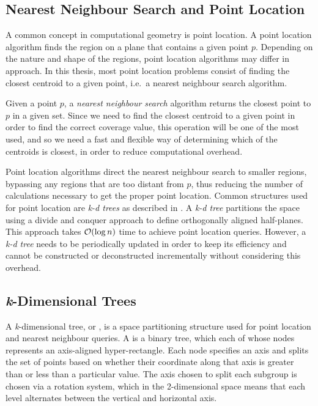 \subsection{Nearest Neighbour Search and Point Location}
A common concept in computational geometry is point location. A point location algorithm finds the region on a plane that contains a given point $p$. Depending on the nature and shape of the regions, point location algorithms may differ in approach. In this thesis, most point location problems consist of finding the closest centroid to a given point, i.e.\ a nearest neighbour search algorithm.

Given a point $p$, a \emph{nearest neighbour search} algorithm returns the closest point to $p$ in a given set. Since we need to find the closest centroid to a given point in order to find the correct coverage value, this operation will be one of the most used, and  so we need a fast and flexible way of determining which of the centroids is closest, in order to reduce computational overhead. 

Point location algorithms direct the nearest neighbour search to smaller regions, bypassing any regions that are too distant from $p$, thus reducing the number of calculations necessary to get the proper point location.
Common structures used for point location are \emph{k-d trees} as described in \citet{incrementalcov}. A \emph{k-d tree} partitions the space using a divide and conquer approach to define orthogonally aligned half-planes. This approach takes $\mathcal{O}(\log{n})$ time to achieve point location queries. However, a \emph{k-d tree} needs to be periodically updated in order to keep its efficiency and cannot be constructed or deconstructed incrementally without considering this overhead.

\subsection{\textit{k}-Dimensional Trees}

A \textit{k}-dimensional tree, or \kdtree, is a space partitioning structure used for point location and nearest neighbour queries. A \kdtree is a binary tree, which each of whose nodes represents an axis-aligned hyper-rectangle. Each node specifies an axis and splits the set of points based on whether their coordinate along that axis is greater than or less than a particular value. The axis chosen to split each subgroup is chosen via a rotation system, which in the 2-dimensional space means that each level alternates between the vertical and horizontal axis.

